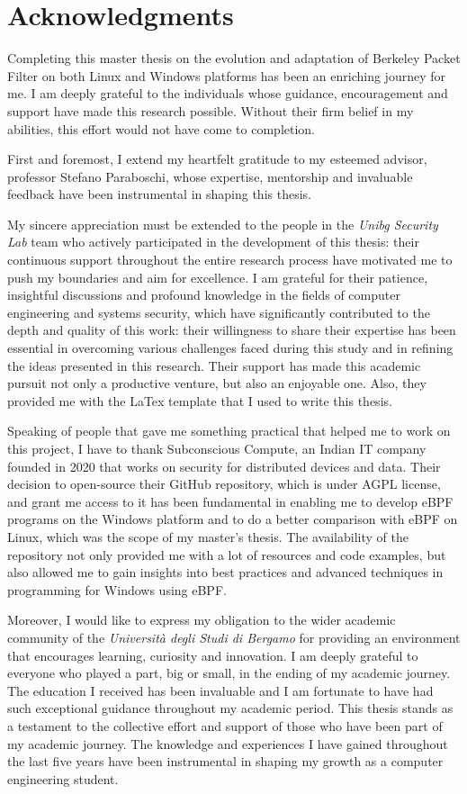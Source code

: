 \chapter{Acknowledgments}

Completing this master thesis on the evolution and adaptation of Berkeley Packet Filter on both Linux and Windows platforms has been an enriching journey for me. 
I am deeply grateful to the individuals whose guidance, encouragement and support have made this research possible. 
Without their firm belief in my abilities, this effort would not have come to completion.

First and foremost, I extend my heartfelt gratitude to my esteemed advisor, professor Stefano Paraboschi, whose expertise, mentorship and invaluable feedback have been instrumental in shaping this thesis. 

My sincere appreciation must be extended to the people in the \textit{Unibg Security Lab} team who actively participated in the development of this thesis: their continuous support throughout the entire research process have motivated me to push my boundaries and aim for excellence. 
I am grateful for their patience, insightful discussions and profound knowledge in the fields of computer engineering and systems security, which have significantly contributed to the depth and quality of this work: their willingness to share their expertise has been essential in overcoming various challenges faced during this study and in refining the ideas presented in this research.
Their support has made this academic pursuit not only a productive venture, but also an enjoyable one.
Also, they provided me with the LaTex template that I used to write this thesis.

Speaking of people that gave me something practical that helped me to work on this project, I have to thank Subconscious Compute, an Indian IT company founded in 2020 that works on security for distributed devices and data.
Their decision to open-source their GitHub repository, which is under AGPL license, and grant me access to it has been fundamental in enabling me to develop eBPF programs on the Windows platform and to do a better comparison with eBPF on Linux, which was the scope of my master's thesis.
The availability of the repository not only provided me with a lot of resources and code examples, but also allowed me to gain insights into best practices and advanced techniques in programming for Windows using eBPF. 

Moreover, I would like to express my obligation to the wider academic community of the \textit{Università degli Studi di Bergamo} for providing an environment that encourages learning, curiosity and innovation. 
I am deeply grateful to everyone who played a part, big or small, in the ending of my academic journey. 
The education I received has been invaluable and I am fortunate to have had such exceptional guidance throughout my academic period. 
This thesis stands as a testament to the collective effort and support of those who have been part of my academic journey. 
The knowledge and experiences I have gained throughout the last five years have been instrumental in shaping my growth as a computer engineering student.

